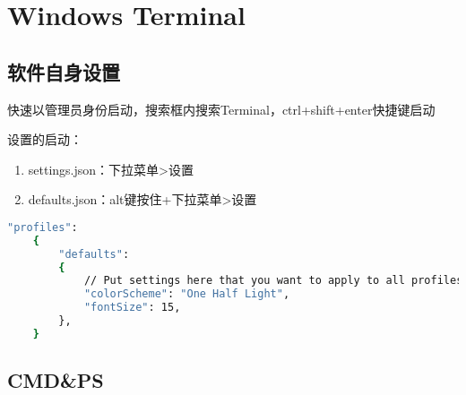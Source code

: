 \chapter{Windows Terminal}

\section{软件自身设置}
快速以管理员身份启动，搜索框内搜索Terminal，ctrl+shift+enter快捷键启动

设置的启动：
\begin{enumerate}
    \item settings.json：下拉菜单>设置
    \item defaults.json：alt键按住+下拉菜单>设置
\end{enumerate}

\begin{lstlisting}[language={bash},title={\textsf{Ternimal的设置：颜色方案和字体大小}}]
    "profiles":
    {
        "defaults":
        {
            // Put settings here that you want to apply to all profiles.
            "colorScheme": "One Half Light",
            "fontSize": 15,
        },
    }
\end{lstlisting}

\section{CMD\&PS}
